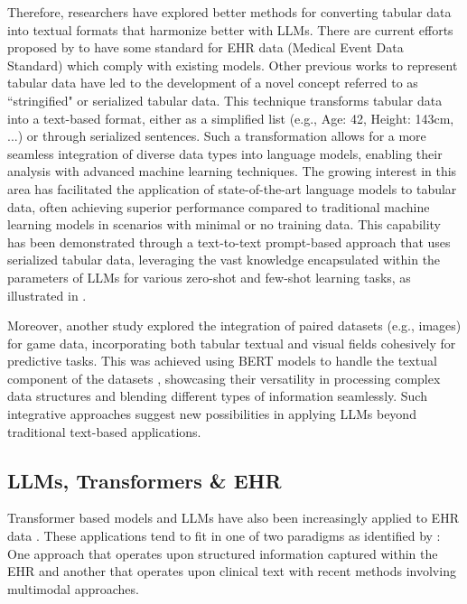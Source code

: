 \documentclass[pmlr]{jmlr}%
\begin{document}
Therefore, researchers have explored better methods for converting tabular data into textual formats that harmonize better with LLMs. There are current efforts proposed by \citep{arnrich2024medical} to have some standard for EHR data (Medical Event Data Standard) which comply with existing models. Other previous works \citep{hegselmann2023tabllm}to represent tabular data have led to the development of a novel concept referred to as ``stringified" or serialized tabular data. This technique transforms tabular data into a text-based format, either as a simplified list (e.g., Age: 42, Height: 143cm, ...) or through serialized sentences. Such a transformation allows for a more seamless integration of diverse data types into language models, enabling their analysis with advanced machine learning techniques. The growing interest in this area has facilitated the application of state-of-the-art language models to tabular data, often achieving superior performance compared to traditional machine learning models in scenarios with minimal or no training data. This capability has been demonstrated through a text-to-text prompt-based approach that uses serialized tabular data, leveraging the vast knowledge encapsulated within the parameters of LLMs for various zero-shot and few-shot learning tasks, as illustrated in \citep{hegselmann2023tabllm}. 

Moreover, another study explored the integration of paired datasets (e.g., images) for game data, incorporating both tabular textual and visual fields cohesively for predictive tasks. This was achieved using BERT models to handle the textual component of the datasets \citep{lu2023MuG}, showcasing their versatility in processing complex data structures and blending different types of information seamlessly. Such integrative approaches suggest new possibilities in applying LLMs beyond traditional text-based applications.

\subsection{LLMs, Transformers \& EHR}
Transformer based models and LLMs have also been increasingly applied to EHR data \citep{kalyan_ammu_2022}. These applications tend to fit in one of two paradigms as identified by \citep{wornow_shaky_2023}: One approach that operates upon structured information captured within the EHR and another that operates upon clinical text with recent methods involving multimodal approaches. 
\end{document}
